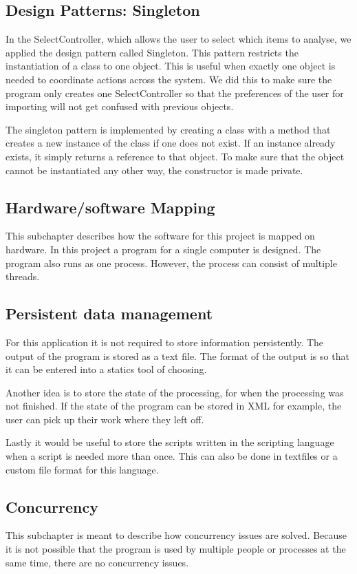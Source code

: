 \documentclass[a4paper,english,fleqn]{exam}
\begin{document}
\subsection{Design Patterns: Singleton}
In the SelectController, which allows the user to select which items to analyse, we applied the design pattern called Singleton. This pattern restricts the instantiation of a class to one object. This is useful when exactly one object is needed to coordinate actions across the system. We did this to make sure the program only creates one SelectController so that the preferences of the user for importing will not get confused with previous objects. 

The singleton pattern is implemented by creating a class with a method that creates a new instance of the class if one does not exist. If an instance already exists, it simply returns a reference to that object. To make sure that the object cannot be instantiated any other way, the constructor is made private. 

\subsection{Hardware/software Mapping}
This subchapter describes how the software for this project is mapped on hardware. In this project a program for a single computer is designed. The program also runs as one process. However, the process can consist of multiple threads. 

\subsection{Persistent data management}
For this application it is not required to store information persistently. The output of the program is stored as a text file. The format of the output is so that it can be entered into a statics tool of choosing.

Another idea is to store the state of the processing, for when the processing was not finished. If the state of the program can be stored in XML for example, the user can pick up their work where they left off. 

Lastly it would be useful to store the scripts written in the scripting language when a script is needed more than once. This can also be done in textfiles or a custom file format for this language. 

\subsection{Concurrency}
This subchapter is meant to describe how concurrency issues are solved. Because it is not possible that the program is used by multiple people or processes at the same time, there are no concurrency issues.  
\newpage
\end{document}
